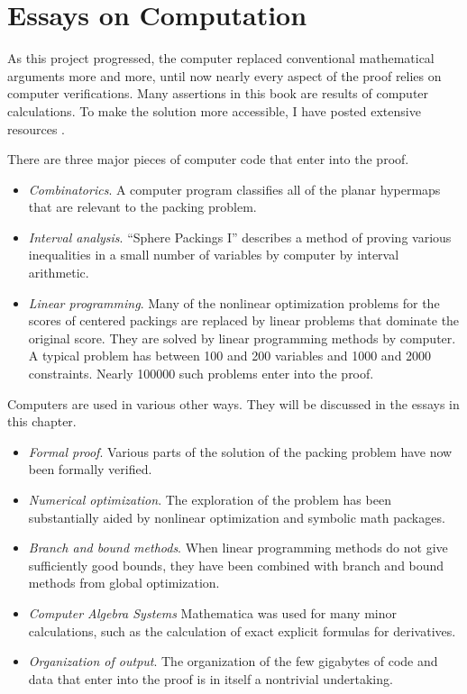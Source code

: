 \chapter{Essays on Computation}


As this project  progressed, the computer  replaced conventional
mathematical arguments more and more, until now
 nearly every aspect of the proof relies on
computer verifications.  Many assertions in this book
 are results of computer calculations.
To make the solution more accessible, I have
posted extensive resources \cite{web}.

There are three major pieces of computer code that enter into the proof.

\begin{itemize}
\item  {\it Combinatorics}.  A computer program classifies all of the planar hypermaps
that are relevant to the packing problem.
\item {\it  Interval analysis}.  ``Sphere Packings
I'' describes a method of proving various inequalities in a small number
of variables by computer by interval arithmetic.
\item {\it  Linear programming}.  Many of the nonlinear optimization
    problems for the scores of centered packings are replaced by linear
    problems that dominate the original score.  They are solved
    by linear programming methods by computer.  A typical problem has
    between 100 and 200 variables and 1000 and 2000 constraints.  Nearly
    100000
    such problems enter into the proof.
\end{itemize}

Computers are used in various other ways.  They will be
discussed in the essays in this chapter.


\begin{itemize}
\item {\it Formal proof}.
    Various parts of the solution of the packing problem have now been
    formally verified.
\item  {\it Numerical optimization}.  The exploration of the problem
    has been substantially
    aided by nonlinear optimization and symbolic math packages.
\item {\it Branch and bound methods}.  When linear programming methods do not
    give sufficiently good bounds, they have been combined with branch
    and bound methods from global optimization.
\item {\it Computer Algebra Systems}  Mathematica was used for many minor calculations,
  such as the calculation of exact  explicit formulas for derivatives.
\item {\it Organization of output}.
    The organization of the few gigabytes of code and data that
    enter into the proof is in itself a nontrivial undertaking.
\end{itemize}



